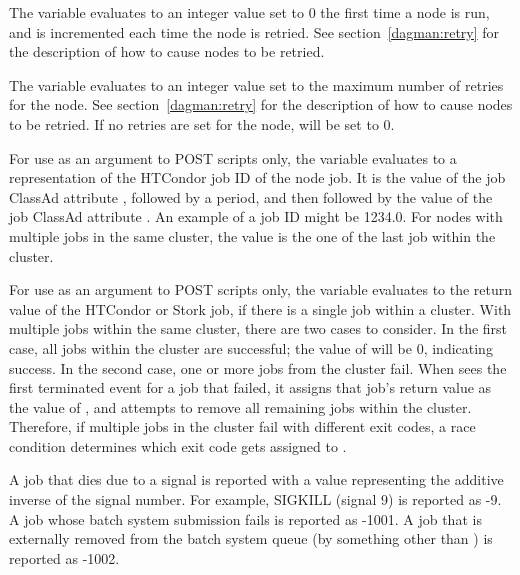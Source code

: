 \begin{itemize}
The variable  evaluates to an 
integer value set to 0 the first time a node is run,
and is  incremented each time the node is retried. 
See section~\ref{dagman:retry} for the description of how to cause
nodes to be retried. 

The variable  evaluates to an integer value set 
to the maximum number of retries for the node.
See section~\ref{dagman:retry} for the description of how to cause
nodes to be retried.  
If no retries are set for the node,
 will be set to 0.

For use as an argument to POST scripts only, the variable 
evaluates to a representation of the HTCondor job ID of the node job.
It is the value of the job ClassAd attribute ,
followed by a period,
and then followed by the value of the job ClassAd attribute .
An example of a job ID might be 1234.0.
For nodes with multiple jobs in the same cluster,
the  value is the one of the last job within the cluster.

For use as an argument to POST scripts only,
the  variable evaluates to the return value of the 
HTCondor or Stork job, if there is a single job within a cluster.
With multiple jobs within the same cluster,
there are two cases to consider.
In the first case, all jobs within the cluster are successful;
the value of  will be 0, indicating success.
In the second case,
one or more jobs from the cluster fail.
When  sees the first terminated event for a job that failed,
it assigns that job's return value as the value
of , and attempts to remove all remaining jobs within the cluster.
Therefore, if multiple jobs in the cluster fail with different exit codes,
a race condition determines which exit code gets assigned to .

A job that dies due to a signal is reported with a  value
representing the additive inverse of the signal number.
For example, SIGKILL (signal 9) is reported as -9.
A job whose batch system submission fails is reported as -1001.
A job that is externally removed from the batch system queue
(by something other than ) is reported as -1002.


\end{itemize}
